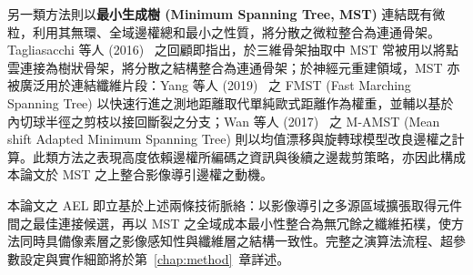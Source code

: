 另一類方法則以\textbf{最小生成樹 (Minimum Spanning Tree, MST)} 連結既有微粒，利用其無環、全域邊權總和最小之性質，將分散之微粒整合為連通骨架。Tagliasacchi 等人 (2016)~\cite{tagliasacchi20163d} 之回顧即指出，於三維骨架抽取中 MST 常被用以將點雲連接為樹狀骨架，將分散之結構整合為連通骨架；於神經元重建領域，MST 亦被廣泛用於連結纖維片段：Yang 等人 (2019)~\cite{yang2019fmst} 之 FMST (Fast Marching Spanning Tree) 以快速行進之測地距離取代單純歐式距離作為權重，並輔以基於內切球半徑之剪枝以接回斷裂之分支；Wan 等人 (2017)~\cite{wan2017mamst} 之 M-AMST (Mean shift Adapted Minimum Spanning Tree) 則以均值漂移與旋轉球模型改良邊權之計算。此類方法之表現高度依賴邊權所編碼之資訊與後續之邊裁剪策略，亦因此構成本論文於 MST 之上整合影像導引邊權之動機。

本論文之 AEL 即立基於上述兩條技術脈絡：以影像導引之多源區域擴張取得元件間之最佳連接候選，再以 MST 之全域成本最小性整合為無冗餘之纖維拓樸，使方法同時具備像素層之影像感知性與纖維層之結構一致性。完整之演算法流程、超參數設定與實作細節將於第~\ref{chap:method}~章詳述。
